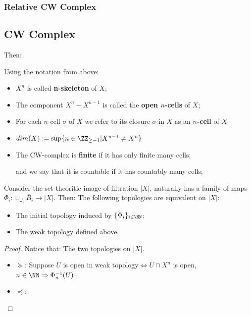 \documentclass[Total.tex]{subfiles}
\begin{document}
	\subsubsection{Relative CW Complex}
	\subsection{CW Complex}

	Then:
	\begin{Def}
		Using the notation from above:
		\begin{itemize}
			\item $X^n$ is called \textbf{n-skeleton} of $X$;
			\item The component $X^n-X^{n-1}$ is called the \textbf{open $n$-cells} of $X$;
			\item For each $n$-cell $\sigma$ of $X$ we refer to its closure $\bar{\sigma}$ in $X$ as an \textbf{$n$-cell} of $X$
			\item $dim(X):=\sup\{n\in \ZZ_{\geq -1}|X^{n-1}\not= X^n\}$
			\item The CW-complex is \textbf{finite} if it has only finite many cells;
			
			and we say that it is countable if it has countably many cells;
		\end{itemize}
	\end{Def}
	\begin{proposition}
		Consider the set-theoritic image of filtration $|X|$, naturally has a family of maps $\Phi_i: \sqcup_{J_i} \bar{B}_i\rightarrow |X|$. Then: The following topologies are equivalent on $|X|$:
		\begin{itemize}
			\item The initial topology induced by $\{\Phi_i\}_{i\in \NN}$;
			\item The weak topology defined above.
		\end{itemize}
	\end{proposition}
	\begin{proof}
		Notice that: The two topologies on $|X|$.
		\begin{itemize}
			\item $\succeq$: Suppose $U$ is open in weak topology$\Leftrightarrow U\cap X^n$ is open,$n\in \NN\Rightarrow \Phi_n^{-1}(U)$ 
			\item $\preceq$:
		\end{itemize}
	\end{proof}
\end{document}
